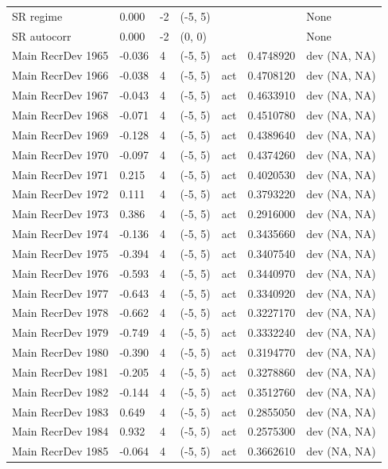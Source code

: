\documentclass[
  english,
  a4paper,
]{article}
\begin{document}
\begin{landscape}
\begin{longtable}[t]{>{\raggedright\arraybackslash}p{8.5cm}lllll>{\raggedright\arraybackslash}p{4cm}}
SR regime & 0.000 & -2 & (-5, 5) &  &  & None\\
SR autocorr & 0.000 & -2 & (0, 0) &  &  & None\\
Main RecrDev 1965 & -0.036 & 4 & (-5, 5) & act & 0.4748920 & dev (NA, NA)\\
Main RecrDev 1966 & -0.038 & 4 & (-5, 5) & act & 0.4708120 & dev (NA, NA)\\
Main RecrDev 1967 & -0.043 & 4 & (-5, 5) & act & 0.4633910 & dev (NA, NA)\\
Main RecrDev 1968 & -0.071 & 4 & (-5, 5) & act & 0.4510780 & dev (NA, NA)\\
Main RecrDev 1969 & -0.128 & 4 & (-5, 5) & act & 0.4389640 & dev (NA, NA)\\
Main RecrDev 1970 & -0.097 & 4 & (-5, 5) & act & 0.4374260 & dev (NA, NA)\\
Main RecrDev 1971 & 0.215 & 4 & (-5, 5) & act & 0.4020530 & dev (NA, NA)\\
Main RecrDev 1972 & 0.111 & 4 & (-5, 5) & act & 0.3793220 & dev (NA, NA)\\
Main RecrDev 1973 & 0.386 & 4 & (-5, 5) & act & 0.2916000 & dev (NA, NA)\\
Main RecrDev 1974 & -0.136 & 4 & (-5, 5) & act & 0.3435660 & dev (NA, NA)\\
Main RecrDev 1975 & -0.394 & 4 & (-5, 5) & act & 0.3407540 & dev (NA, NA)\\
Main RecrDev 1976 & -0.593 & 4 & (-5, 5) & act & 0.3440970 & dev (NA, NA)\\
Main RecrDev 1977 & -0.643 & 4 & (-5, 5) & act & 0.3340920 & dev (NA, NA)\\
Main RecrDev 1978 & -0.662 & 4 & (-5, 5) & act & 0.3227170 & dev (NA, NA)\\
Main RecrDev 1979 & -0.749 & 4 & (-5, 5) & act & 0.3332240 & dev (NA, NA)\\
Main RecrDev 1980 & -0.390 & 4 & (-5, 5) & act & 0.3194770 & dev (NA, NA)\\
Main RecrDev 1981 & -0.205 & 4 & (-5, 5) & act & 0.3278860 & dev (NA, NA)\\
Main RecrDev 1982 & -0.144 & 4 & (-5, 5) & act & 0.3512760 & dev (NA, NA)\\
Main RecrDev 1983 & 0.649 & 4 & (-5, 5) & act & 0.2855050 & dev (NA, NA)\\
Main RecrDev 1984 & 0.932 & 4 & (-5, 5) & act & 0.2575300 & dev (NA, NA)\\
Main RecrDev 1985 & -0.064 & 4 & (-5, 5) & act & 0.3662610 & dev (NA, NA)\\

\end{longtable}
\end{landscape}
\end{document}
